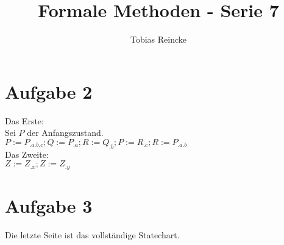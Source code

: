 \documentclass[]{article}
\title{Formale Methoden - Serie 7}
\author{Tobias Reincke}
\begin{document}
\maketitle





\section*{Aufgabe 2}
Das Erste: \\
Sei $P$ der Anfangszustand.\\
$P := P_{.a.b.c};Q := P_{.a}; R :=Q_{.b}; P:= R_{.c}; R:=P_{.a.b} $ \\

Das Zweite: \\
$Z:= Z_{.x} ; Z :=Z_{.y}$\\


\section*{Aufgabe 3}
Die letzte Seite ist das vollständige Statechart.

\end{document}
